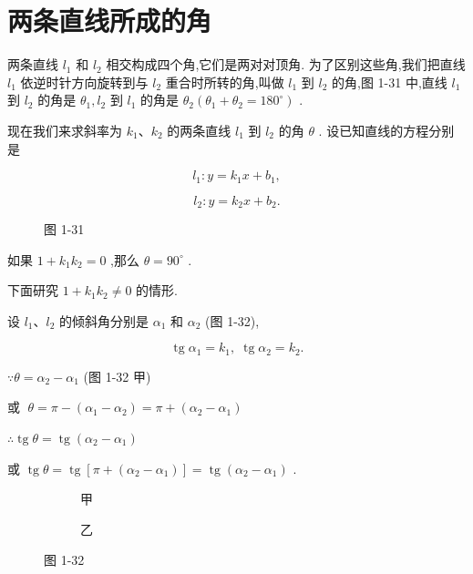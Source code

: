 \documentclass[lang=cn,newtx,10.5pt,scheme=chinese]{elegantbook}
\begin{document}
\section{两条直线所成的角}

两条直线 \({l}_{1}\) 和 \({l}_{2}\) 相交构成四个角,它们是两对对顶角. 为了区别这些角,我们把直线 \({l}_{1}\) 依逆时针方向旋转到与 \({l}_{2}\) 重合时所转的角,叫做 \({l}_{1}\) 到 \({l}_{2}\) 的角,图 1-31 中,直线 \({l}_{1}\) 到 \({l}_{2}\) 的角是 \({\theta }_{1},{l}_{2}\) 到 \({l}_{1}\) 的角是 \({\theta }_{2}\left( {{\theta }_{1} + {\theta }_{2} = {180}^{ \circ }}\right)\) .

现在我们来求斜率为 \({k}_{1}\text{、}{k}_{2}\) 的两条直线 \({l}_{1}\) 到 \({l}_{2}\) 的角 \(\theta\) . 设已知直线的方程分别是

\[
    {l}_{1} : y = {k}_{1}x + {b}_{1},
\]

\[
    {l}_{2} : y = {k}_{2}x + {b}_{2}.
\]

\begin{figure}[h]
  \centering
  
  \caption{图 1-31}
\end{figure}

如果 \(1 + {k}_{1}{k}_{2} = 0\) ,那么 \(\theta = {90}^{ \circ }\) .

下面研究 \(1 + {k}_{1}{k}_{2} \neq 0\) 的情形.

设 \({l}_{1}\text{、}{l}_{2}\) 的倾斜角分别是 \({\alpha }_{1}\) 和 \({\alpha }_{2}\) (图 1-32),

\[
  \operatorname{tg}{\alpha }_{1} = {k}_{1},\;\operatorname{tg}{\alpha }_{2} = {k}_{2}.
\]

\(\because \theta = {\alpha }_{2} - {\alpha }_{1}\) (图 1-32 甲)

或 \(\;\theta = \pi - \left( {{\alpha }_{1} - {\alpha }_{2}}\right) = \pi + \left( {{\alpha }_{2} - {\alpha }_{1}}\right)\)

\(\therefore \operatorname{tg}\theta = \operatorname{tg}\left( {{\alpha }_{2} - {\alpha }_{1}}\right)\)

或 \(\operatorname{tg}\theta = \operatorname{tg}\left\lbrack {\pi + \left( {{\alpha }_{2} - {\alpha }_{1}}\right) }\right\rbrack = \operatorname{tg}\left( {{\alpha }_{2} - {\alpha }_{1}}\right)\) .

\begin{figure}[h]
	\centering
	\begin{subfigure}[h]{0.45\textwidth}
		\centering
		
		\caption{甲}
	\end{subfigure}
	\hfill %
	\begin{subfigure}[h]{0.45\textwidth}
		\centering
		
		\caption{乙}
	\end{subfigure}
	\caption{图 1-32}
\end{figure}
\end{document}
